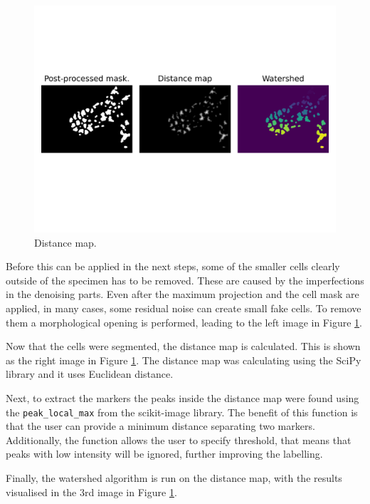 \documentclass[
  digital,     %
  oneside,     %
  nosansbold,  %
  nocolorbold, %
  lof,         %
  lot,         %
]{fithesis4}
\begin{document}
\begin{figure}
    \begin{center}
        \includegraphics[width=\linewidth]{resources/distance_map.png}
    \end{center}
    \caption{Distance map.}
    \label{fig:distance_map}
\end{figure}

Before this can be applied in the next steps, some of the smaller cells clearly
outside of the specimen has to be removed. These are caused by the imperfections
in the denoising parts. Even after the maximum projection and the cell mask are
applied, in many cases, some residual noise can create small fake cells. To
remove them a morphological opening is performed, leading to the left image in
Figure \ref{fig:distance_map}.

Now that the cells were segmented, the distance map is calculated. This is shown
as the right image in Figure \ref{fig:distance_map}. The distance map was
calculating using the SciPy library and it uses Euclidean distance.

Next, to extract the markers the peaks inside the distance map were found using
the \texttt{peak\_local\_max} from the scikit-image library. The benefit of
this function is that the user can provide a minimum distance separating two
markers. Additionally, the function allows the user to specify threshold, that
means that peaks with low intensity will be ignored, further improving the
labelling.

Finally, the watershed algorithm is run on the distance map, with the results
visualised in the 3rd image in Figure \ref{fig:distance_map}.
\end{document}
